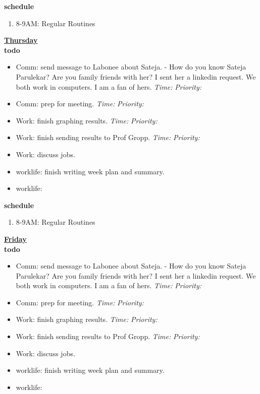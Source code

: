\documentclass[11pt]{article}
\newcommand{\timeEst}[1]{\textit{Time:} \textit{#1}}
\newcommand{\priority}[1]{\textit{Priority:} \textit{#1}}
\newcommand{\deadline}[1]{#1}
\begin{document}
{\textbf{\small schedule} \\
  \begin{enumerate}
    \tiny \item \tiny 8-9AM: Regular Routines 
  \end{enumerate} 
  
  \textbf{\small \underline{Thursday}} \\
  \textbf{\small todo} \\
  \begin{itemize}
    \tiny \item \tiny Comm: send message to Labonee about Sateja. - How do you know Sateja Parulekar? Are you family friends with her? I sent her a linkedin request. We both work in computers. I am a fan of hers. 
    \deadline{} \timeEst{} \priority{}  
    \tiny \item \tiny Comm: prep for meeting. \deadline{} \timeEst{} \priority{}  
  \item \tiny Work: finish graphing results.  \deadline{ }   \timeEst{}  \priority{}
  \item \tiny Work: finish sending results to Prof Gropp.  \deadline{ }   \timeEst{}  \priority{}  
  \item \tiny Work: discuss jobs.  
  \item \tiny worklife: finish writing week plan and summary. 
  \item \tiny worklife: 
  \end{itemize}

  \textbf{\small schedule} \\
  \begin{enumerate}
    \tiny \item \tiny 8-9AM: Regular Routines 
  \end{enumerate} 
  
  
  \textbf{\small \underline{Friday}} \\
  \textbf{\small todo} \\
  \begin{itemize}
  \tiny \item \tiny Comm: send message to Labonee about Sateja. - How do you know Sateja Parulekar? Are you family friends with her? I sent her a linkedin request. We both work in computers. I am a fan of hers. 
  \deadline{} \timeEst{} \priority{}  
  \tiny \item \tiny Comm: prep for meeting. \deadline{} \timeEst{} \priority{}  
\item \tiny Work: finish graphing results.  \deadline{ }   \timeEst{}  \priority{}
\item \tiny Work: finish sending results to Prof Gropp.  \deadline{ }   \timeEst{}  \priority{}  
\item \tiny Work: discuss jobs.  
\item \tiny worklife: finish writing week plan and summary. 
  \item \tiny worklife: 
  \end{itemize}
  
}
\end{document}
